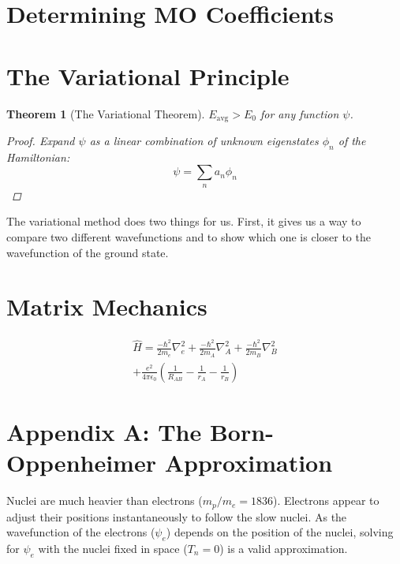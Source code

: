 \documentclass[a4paper]{tufte-handout}
\newtheorem{theorem}{Theorem}
\theoremstyle{definition}
\begin{document}
\section{Determining MO Coefficients}

\section{The Variational Principle}

\begin{theorem}[The Variational Theorem] $E_{\mathrm{avg}} > E_0$ for any function $\psi$. 

  \begin{proof}
    Expand $\psi$ as a linear combination of unknown eigenstates $\phi_n$ of the Hamiltonian:
    \begin{equation*}
      \psi = \sum_n a_n \phi_n
    \end{equation*}
  \end{proof}
  
\end{theorem}

The variational method does two things for us. First, it gives us a way to compare two 
different wavefunctions and to show which one is closer to the wavefunction of the ground state. 

\section{Matrix Mechanics}

\begin{align}
  \hat{H} = \frac{-\hbar^2}{2m_e}\nabla^2_e + \frac{-\hbar^2}{2m_A}\nabla^2_A + \frac{-\hbar^2}{2m_B}\nabla^2_B \\
  + \frac{e^2}{4\pi\epsilon_0} \left( \frac{1}{R_{AB}} - \frac{1}{r_{A}} - \frac{1}{r_{B}} \right)
\end{align}

\section{Appendix A: The Born-Oppenheimer Approximation}

Nuclei are much heavier than electrons ($m_p / m_e = 1836$). Electrons appear to adjust their positions instantaneously to follow the slow nuclei.
As the wavefunction of the electrons ($\psi_e$) depends on the position of the nuclei, solving for $\psi_e$ with the nuclei fixed in space ($T_n = 0$) is a valid approximation.
\end{document}
